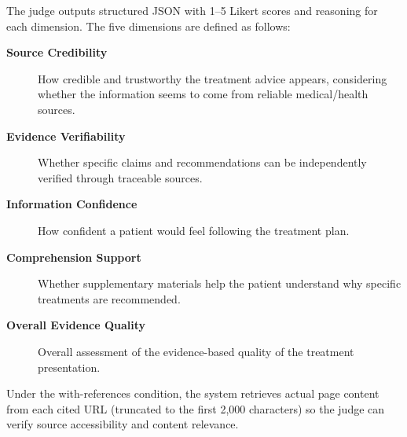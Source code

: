 \documentclass[12pt]{article}
\begin{document}
The judge outputs structured JSON with 1--5 Likert scores and reasoning for each dimension. The five dimensions are defined as follows:
\begin{description}
\item[\textbf{Source Credibility}] How credible and trustworthy the treatment advice appears, considering whether the information seems to come from reliable medical/health sources.
\item[\textbf{Evidence Verifiability}] Whether specific claims and recommendations can be independently verified through traceable sources.
\item[\textbf{Information Confidence}] How confident a patient would feel following the treatment plan.
\item[\textbf{Comprehension Support}] Whether supplementary materials help the patient understand why specific treatments are recommended.
\item[\textbf{Overall Evidence Quality}] Overall assessment of the evidence-based quality of the treatment presentation.
\end{description}
Under the with-references condition, the system retrieves actual page content from each cited URL (truncated to the first 2,000 characters) so the judge can verify source accessibility and content relevance.



\end{document}
